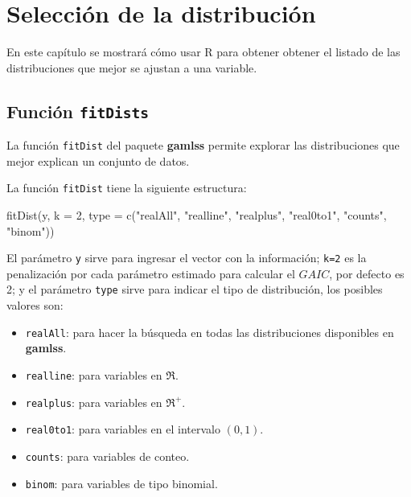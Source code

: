 \documentclass[
]{book}
\makeatletter
\newenvironment{Shaded}{\begin{snugshade}}{\end{snugshade}}
\newcommand{\AttributeTok}[1]{\textcolor[rgb]{0.77,0.63,0.00}{#1}}
\newcommand{\DecValTok}[1]{\textcolor[rgb]{0.00,0.00,0.81}{#1}}
\newcommand{\FunctionTok}[1]{\textcolor[rgb]{0.00,0.00,0.00}{#1}}
\newcommand{\NormalTok}[1]{#1}
\newcommand{\StringTok}[1]{\textcolor[rgb]{0.31,0.60,0.02}{#1}}
\providecommand{\tightlist}{%
  \setlength{\itemsep}{0pt}\setlength{\parskip}{0pt}}
\newenvironment{kframe}{%
\medskip{}
\setlength{\fboxsep}{.8em}
 \def\at@end@of@kframe{}%
 \ifinner\ifhmode%
  \def\at@end@of@kframe{\end{minipage}}%
  \begin{minipage}{\columnwidth}%
 \fi\fi%
 \def\FrameCommand##1{\hskip\@totalleftmargin \hskip-\fboxsep
 \colorbox{shadecolor}{##1}\hskip-\fboxsep
     \hskip-\linewidth \hskip-\@totalleftmargin \hskip\columnwidth}%
 \MakeFramed {\advance\hsize-\width
   \@totalleftmargin\z@ \linewidth\hsize
   \@setminipage}}%
 {\par\unskip\endMakeFramed%
 \at@end@of@kframe}
\renewenvironment{Shaded}{\begin{kframe}}{\end{kframe}}
\makeatother
\begin{document}
\hypertarget{select_dist}{%
\chapter{Selección de la distribución}\label{select_dist}}

En este capítulo se mostrará cómo usar R para obtener obtener el listado de las distribuciones que mejor se ajustan a una variable.

\hypertarget{funciuxf3n-fitdists}{%
\section{\texorpdfstring{Función \texttt{fitDists}}{Función fitDists}}\label{funciuxf3n-fitdists}}

La función \texttt{fitDist} del paquete \textbf{gamlss}  permite explorar las distribuciones que mejor explican un conjunto de datos.

La función \texttt{fitDist} tiene la siguiente estructura:

\begin{Shaded}
\begin{Highlighting}[]
\FunctionTok{fitDist}\NormalTok{(y, }\AttributeTok{k =} \DecValTok{2}\NormalTok{, }
      \AttributeTok{type =} \FunctionTok{c}\NormalTok{(}\StringTok{"realAll"}\NormalTok{, }\StringTok{"realline"}\NormalTok{, }\StringTok{"realplus"}\NormalTok{,}
               \StringTok{"real0to1"}\NormalTok{, }\StringTok{"counts"}\NormalTok{, }\StringTok{"binom"}\NormalTok{))}
\end{Highlighting}
\end{Shaded}

El parámetro \texttt{y} sirve para ingresar el vector con la información; \texttt{k=2} es la penalización por cada parámetro estimado para calcular el \(GAIC\), por defecto es 2; y el parámetro \texttt{type} sirve para indicar el tipo de distribución, los posibles valores son:

\begin{itemize}
\tightlist
\item
  \texttt{realAll}: para hacer la búsqueda en todas las distribuciones disponibles en \textbf{gamlss}.
\item
  \texttt{realline}: para variables en \(\Re\).
\item
  \texttt{realplus}: para variables en \(\Re^+\).
\item
  \texttt{real0to1}: para variables en el intervalo \((0, 1)\).
\item
  \texttt{counts}: para variables de conteo.
\item
  \texttt{binom}: para variables de tipo binomial.
\end{itemize}
\end{document}
